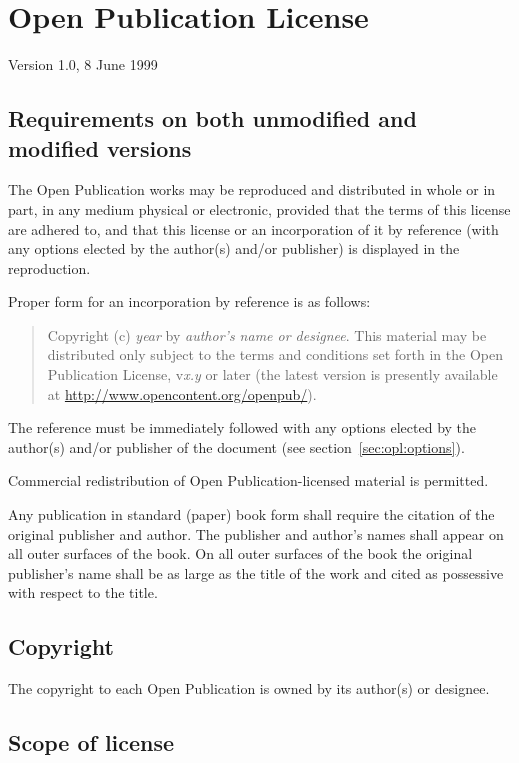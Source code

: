 \chapter{Open Publication License}
\label{cha:opl}

Version 1.0, 8 June 1999

\section{Requirements on both unmodified and modified versions}

The Open Publication works may be reproduced and distributed in whole
or in part, in any medium physical or electronic, provided that the
terms of this license are adhered to, and that this license or an
incorporation of it by reference (with any options elected by the
author(s) and/or publisher) is displayed in the reproduction.

Proper form for an incorporation by reference is as follows:

\begin{quote}
  Copyright (c) \emph{year} by \emph{author's name or designee}. This
  material may be distributed only subject to the terms and conditions
  set forth in the Open Publication License, v\emph{x.y} or later (the
  latest version is presently available at
  \url{http://www.opencontent.org/openpub/}).
\end{quote}

The reference must be immediately followed with any options elected by
the author(s) and/or publisher of the document (see
section~\ref{sec:opl:options}).

Commercial redistribution of Open Publication-licensed material is
permitted.

Any publication in standard (paper) book form shall require the
citation of the original publisher and author. The publisher and
author's names shall appear on all outer surfaces of the book. On all
outer surfaces of the book the original publisher's name shall be as
large as the title of the work and cited as possessive with respect to
the title.

\section{Copyright}

The copyright to each Open Publication is owned by its author(s) or
designee.

\section{Scope of license}

